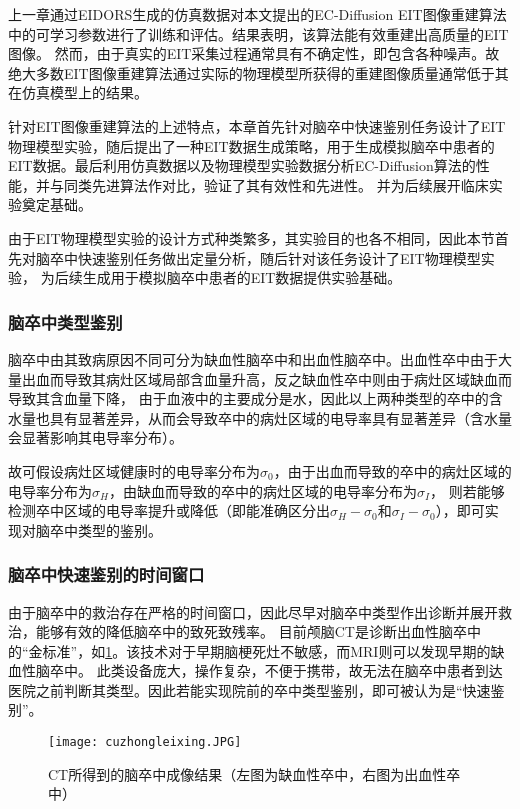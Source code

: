 

上一章通过EIDORS生成的仿真数据对本文提出的EC-Diffusion EIT图像重建算法中的可学习参数进行了训练和评估。结果表明，该算法能有效重建出高质量的EIT图像。
然而，由于真实的EIT采集过程通常具有不确定性，即包含各种噪声。故绝大多数EIT图像重建算法通过实际的物理模型所获得的重建图像质量通常低于其在仿真模型上的结果。

针对EIT图像重建算法的上述特点，本章首先针对脑卒中快速鉴别任务设计了EIT物理模型实验，随后提出了一种EIT数据生成策略，用于生成模拟脑卒中患者的EIT数据。最后利用仿真数据以及物理模型实验数据分析EC-Diffusion算法的性能，并与同类先进算法作对比，验证了其有效性和先进性。
并为后续展开临床实验奠定基础。

由于EIT物理模型实验的设计方式种类繁多，其实验目的也各不相同，因此本节首先对脑卒中快速鉴别任务做出定量分析，随后针对该任务设计了EIT物理模型实验，
为后续生成用于模拟脑卒中患者的EIT数据提供实验基础。


\subsubsection{脑卒中类型鉴别}
脑卒中由其致病原因不同可分为缺血性脑卒中和出血性脑卒中。出血性卒中由于大量出血而导致其病灶区域局部含血量升高，反之缺血性卒中则由于病灶区域缺血而导致其含血量下降，
由于血液中的主要成分是水，因此以上两种类型的卒中的含水量也具有显著差异，从而会导致卒中的病灶区域的电导率具有显著差异（含水量会显著影响其电导率分布）。

故可假设病灶区域健康时的电导率分布为$\sigma_0$，由于出血而导致的卒中的病灶区域的电导率分布为$\sigma_H$，由缺血而导致的卒中的病灶区域的电导率分布为$\sigma_I$，
则若能够检测卒中区域的电导率提升或降低（即能准确区分出$\sigma_H - \sigma_0$和$\sigma_I - \sigma_0$），即可实现对脑卒中类型的鉴别。

\subsubsection{脑卒中快速鉴别的时间窗口}
由于脑卒中的救治存在严格的时间窗口，因此尽早对脑卒中类型作出诊断并展开救治，能够有效的降低脑卒中的致死致残率。
目前颅脑CT是诊断出血性脑卒中的“金标准”，如\cref{figure:cuzhongleixing}。该技术对于早期脑梗死灶不敏感，而MRI则可以发现早期的缺血性脑卒中。
此类设备庞大，操作复杂，不便于携带，故无法在脑卒中患者到达医院之前判断其类型。因此若能实现院前的卒中类型鉴别，即可被认为是“快速鉴别”。
\begin{figure}[h]
    \centering
    \texttt{[image: cuzhongleixing.JPG]}
    \caption{CT所得到的脑卒中成像结果（左图为缺血性卒中，右图为出血性卒中）\cite{5335289}}
    \label{figure:cuzhongleixing}
\end{figure}

